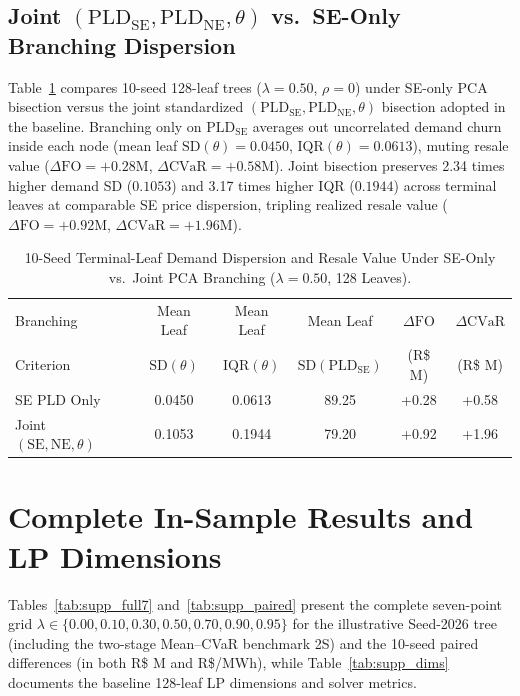 \documentclass[10pt,journal]{IEEEtran}
\begin{document}
\subsection{Joint $(\text{PLD}_{\text{SE}}, \text{PLD}_{\text{NE}}, \theta)$ vs.\ SE-Only Branching Dispersion}
Table~\ref{tab:supp_branching} compares 10-seed 128-leaf trees ($\lambda=0.50$, $\rho=0$) under SE-only PCA bisection versus the joint standardized $(\text{PLD}_{\text{SE}}, \text{PLD}_{\text{NE}}, \theta)$ bisection adopted in the baseline. Branching only on $\text{PLD}_{\text{SE}}$ averages out uncorrelated demand churn inside each node (mean leaf $\text{SD}(\theta) = 0.0450$, $\text{IQR}(\theta) = 0.0613$), muting resale value ($\Delta\mathrm{FO} = +0.28\text{M}$, $\Delta\mathrm{CVaR} = +0.58\text{M}$). Joint bisection preserves 2.34 times higher demand SD ($0.1053$) and 3.17 times higher IQR ($0.1944$) across terminal leaves at comparable SE price dispersion, tripling realized resale value ($\Delta\mathrm{FO} = +0.92\text{M}$, $\Delta\mathrm{CVaR} = +1.96\text{M}$).

\begin{table}[htbp]
\centering
\caption{10-Seed Terminal-Leaf Demand Dispersion and Resale Value Under SE-Only vs.\ Joint PCA Branching ($\lambda = 0.50$, 128 Leaves).}
\label{tab:supp_branching}
\scriptsize
\setlength{\tabcolsep}{2.4pt}
\begin{tabular}{lccccc}
\toprule
Branching & Mean Leaf & Mean Leaf & Mean Leaf & $\Delta\mathrm{FO}$ & $\Delta\mathrm{CVaR}$ \\
Criterion & $\text{SD}(\theta)$ & $\text{IQR}(\theta)$ & $\text{SD}(\text{PLD}_{\text{SE}})$ & (R\$ M) & (R\$ M) \\
\midrule
SE PLD Only & 0.0450 & 0.0613 & 89.25 & +0.28 & +0.58 \\
Joint $(\text{SE}, \text{NE}, \theta)$ & 0.1053 & 0.1944 & 79.20 & +0.92 & +1.96 \\
\bottomrule
\end{tabular}
\end{table}

\section{Complete In-Sample Results and LP Dimensions}
\label{sec:supp_insample}

Tables~\ref{tab:supp_full7} and~\ref{tab:supp_paired} present the complete seven-point grid $\lambda \in \{0.00, 0.10, 0.30, 0.50, 0.70, 0.90, 0.95\}$ for the illustrative Seed-2026 tree (including the two-stage Mean--CVaR benchmark 2S) and the 10-seed paired differences (in both R\$ M and R\$/MWh), while Table~\ref{tab:supp_dims} documents the baseline 128-leaf LP dimensions and solver metrics.
\end{document}
